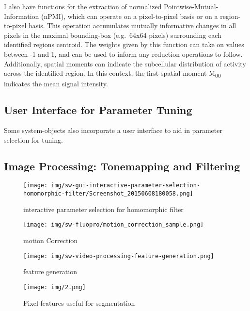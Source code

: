 \documentclass[
  12pt,
]{report}
\numberwithin{figure}{section}
\numberwithin{table}{section}
\numberwithin{equations}{section}
\begin{document}
I also have functions for the extraction of normalized
Pointwise-Mutual-Information (nPMI), which can operate on a
pixel-to-pixel basis or on a region-to-pixel basis. This operation
accumulates mutually informative changes in all pixels in the maximal
bounding-box (e.g.~64x64 pixels) surrounding each identified regions
centroid. The weights given by this function can take on values between
-1 and 1, and can be used to inform any reduction operations to follow.
Additionally, spatial moments can indicate the subcellular distribution
of activity across the identified region. In this context, the first
spatial moment M\textsubscript{00} indicates the mean signal intensity.

\hypertarget{user-interface-for-parameter-tuning}{%
\subsection{User Interface for Parameter
Tuning}\label{user-interface-for-parameter-tuning}}

Some system-objects also incorporate a user interface to aid in
parameter selection for tuning.

\hypertarget{image-processing-tonemapping-and-filtering}{%
\subsection{Image Processing: Tonemapping and
Filtering}\label{image-processing-tonemapping-and-filtering}}

\begin{figure}
\centering
\texttt{[image: img/sw-gui-interactive-parameter-selection-homomorphic-filter/Screenshot\_20150608180058.png]}
\caption{interactive parameter selection for homomorphic filter}
\end{figure}

\begin{figure}
\centering
\texttt{[image: img/sw-fluopro/motion\_correction\_sample.png]}
\caption{motion Correction}
\end{figure}

\begin{figure}
\centering
\texttt{[image: img/sw-video-processing-feature-generation.png]}
\caption{feature generation}
\end{figure}

\begin{figure}
\centering
\texttt{[image: img/2.png]}
\caption{Pixel features useful for segmentation}
\end{figure}
\end{document}
